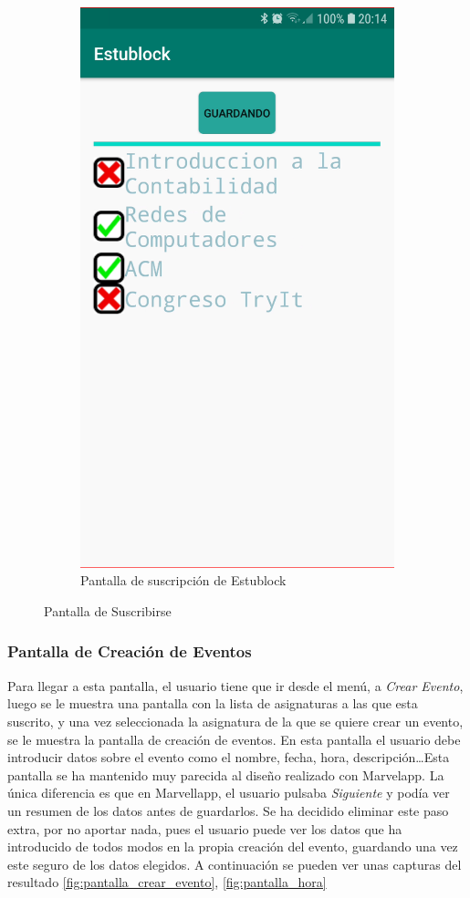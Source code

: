 \begin{figure}[hbt]
\begin{subfigure}[b]{0.4\linewidth}
        \includegraphics[width=0.7\linewidth]{figs/Desarrollo/Interfaz/estublock_asignaturas}
        \caption[Estublock Suscribirse]{Pantalla de suscripción de Estublock}
	\end{subfigure} 
	\caption[Pantalla de Suscribirse]{Pantalla de Suscribirse}
	\label{fig:pantalla_añadir_sus}
\end{figure}

\subsubsection{Pantalla de Creación de Eventos}

Para llegar a esta pantalla, el usuario tiene que ir desde el menú, a \textit{Crear Evento}, luego se le muestra una pantalla con la lista de asignaturas a las que esta suscrito, y una vez seleccionada la asignatura de la que se quiere crear un evento, se le muestra la pantalla de creación de eventos. En esta pantalla el usuario debe introducir datos sobre el evento como el nombre, fecha, hora, descripción\dots Esta pantalla se ha mantenido muy parecida al diseño realizado con Marvelapp. La única diferencia es que en Marvellapp, el usuario pulsaba \textit{Siguiente} y podía ver un resumen de los datos antes de guardarlos. Se ha decidido eliminar este paso extra, por no aportar nada, pues el usuario puede ver los datos que ha introducido de todos modos en la propia creación del evento, guardando una vez este seguro de los datos elegidos. A continuación se pueden ver unas capturas del resultado \ref{fig:pantalla_crear_evento}, \ref{fig:pantalla_hora}


